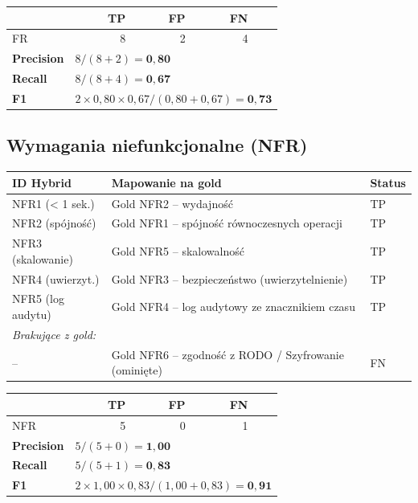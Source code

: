 \documentclass[12pt,a4paper]{article}
\newcommand{\tp}[1]{\colorbox{tpcolor}{\small #1}}
\newcommand{\fn}[1]{\colorbox{fncolor}{\small #1}}
\begin{document}
\vspace{0.5em}
\begin{tabular}{lrrrr}
\toprule
& \textbf{TP} & \textbf{FP} & \textbf{FN} & \\
\midrule
FR & 8 & 2 & 4 & \\
\midrule
\textbf{Precision} & \multicolumn{4}{l}{$8 / (8+2) = \mathbf{0{,}80}$} \\
\textbf{Recall}    & \multicolumn{4}{l}{$8 / (8+4) = \mathbf{0{,}67}$} \\
\textbf{F1}        & \multicolumn{4}{l}{$2 \times 0{,}80 \times 0{,}67 / (0{,}80+0{,}67) = \mathbf{0{,}73}$} \\
\bottomrule
\end{tabular}

\vspace{1em}
\subsection{Wymagania niefunkcjonalne (NFR)}

\begin{tabular}{p{2.5cm} p{7cm} l}
\toprule
\textbf{ID Hybrid} & \textbf{Mapowanie na gold} & \textbf{Status} \\
\midrule
NFR1 (< 1 sek.) & Gold NFR2 -- wydajność & \tp{TP} \\
NFR2 (spójność) & Gold NFR1 -- spójność równoczesnych operacji & \tp{TP} \\
NFR3 (skalowanie)& Gold NFR5 -- skalowalność & \tp{TP} \\
NFR4 (uwierzyt.) & Gold NFR3 -- bezpieczeństwo (uwierzytelnienie) & \tp{TP} \\
NFR5 (log audytu)& Gold NFR4 -- log audytowy ze znacznikiem czasu & \tp{TP} \\
\midrule
\multicolumn{3}{l}{\textit{Brakujące z gold:}} \\
-- & Gold NFR6 -- zgodność z RODO / Szyfrowanie (ominięte) & \fn{FN} \\
\bottomrule
\end{tabular}

\vspace{0.5em}
\begin{tabular}{lrrrr}
\toprule
& \textbf{TP} & \textbf{FP} & \textbf{FN} & \\
\midrule
NFR & 5 & 0 & 1 & \\
\midrule
\textbf{Precision} & \multicolumn{4}{l}{$5 / (5+0) = \mathbf{1{,}00}$} \\
\textbf{Recall}    & \multicolumn{4}{l}{$5 / (5+1) = \mathbf{0{,}83}$} \\
\textbf{F1}        & \multicolumn{4}{l}{$2 \times 1{,}00 \times 0{,}83 / (1{,}00+0{,}83) = \mathbf{0{,}91}$} \\
\bottomrule
\end{tabular}
\end{document}
